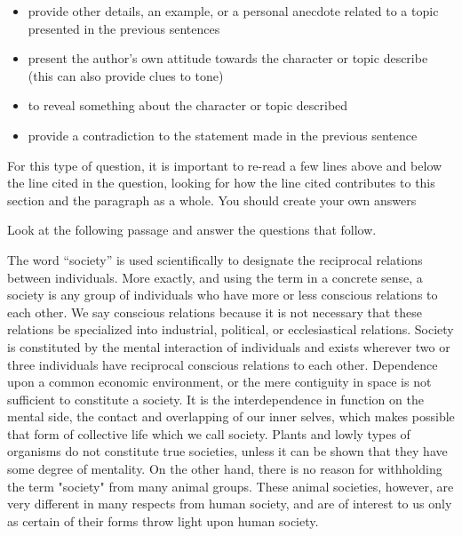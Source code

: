 \begin{itemize}
\bigskip
\item provide other details, an example, or a personal anecdote related to a topic presented in the previous sentences

\bigskip
\item present the author's own attitude towards the character or topic describe (this can also provide clues to tone)

\bigskip
\item to reveal something about the character or topic described

\bigskip
\item provide a contradiction to the statement made in the previous sentence

\end{itemize}

\bigskip
For this type of question, it is important to re-read a few lines above and below the line cited in the question, looking for how the line cited contributes to this section and the paragraph as a whole. You should create your own answers

\bigskip
Look at the following passage and answer the questions that follow. 

\bigskip
\begin{linenumbers*}
\modulolinenumbers[5]
The word ``society'' is used scientifically to designate the reciprocal relations between individuals. More exactly, and using the term in a concrete sense, a society is any group of individuals who have more or less conscious relations to each other. We say conscious relations because it is not necessary that these relations be specialized into industrial, political, or ecclesiastical relations. Society is constituted by the mental interaction of individuals and exists wherever two or three individuals have reciprocal conscious relations to each other. Dependence upon a common economic environment, or the mere contiguity in space is not sufficient to constitute a society. It is the interdependence in function on the mental side, the contact and overlapping of our inner selves, which makes possible that form of collective life which we call society. Plants and lowly types of organisms do not constitute true societies, unless it can be shown that they have some degree of mentality. On the other hand, there is no reason for withholding the term "society" from many animal groups. These animal societies, however, are very different in many respects from human society, and are of interest to us only as certain of their forms throw light upon human society.
\end{linenumbers*}

